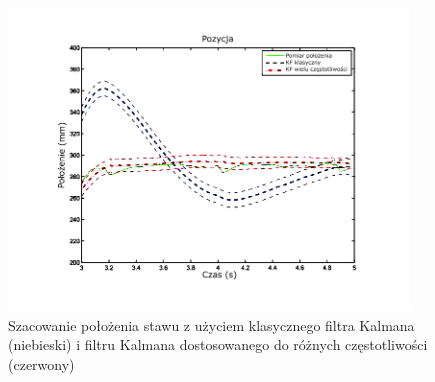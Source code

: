	\begin{figure}[!htp]
		\centering 
		\includegraphics[width=0.95\textwidth]{images/Fig03.png}	
		\caption{Szacowanie położenia stawu z użyciem klasycznego filtra Kalmana (niebieski) i filtru Kalmana dostosowanego do różnych częstotliwości (czerwony) \cite{Murray-Smith2014}}
		\label{fig:literature:feng}
	\end{figure}
	
